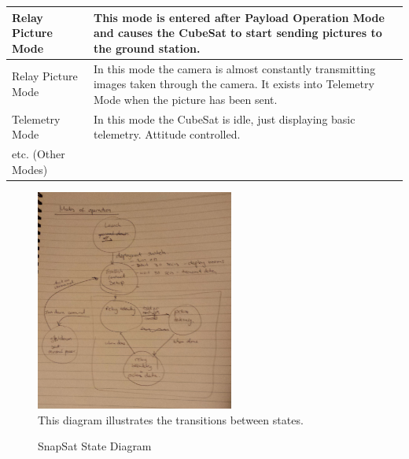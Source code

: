 \begin{table}[H]
{\begin{tabular}{|>{\arraybackslash}m{4.5cm}|>{\arraybackslash}m{10.5cm}|}
            \\\hline
            Relay Picture Mode & This mode is entered after Payload Operation Mode and causes the CubeSat to start sending pictures to the ground station. 
            \\\hline
            Relay Picture Mode & In this mode the camera is almost constantly transmitting images taken through the camera.  It exists into Telemetry Mode when the picture has been sent. 
            \\\hline
            Telemetry Mode & In this mode the CubeSat is idle, just displaying basic telemetry.  Attitude controlled.
            \\\hline
            etc. (Other Modes) &   \\\hline
        \end{tabular} } 
\end{table}

\begin{figure}[H]
    \centering
    \caption{SnapSat State Diagram}
    \vspace{0.15cm}
    \includegraphics[width=6.5cm]{ModesOfOperation.png}
    \\This diagram illustrates the transitions between states.
\end{figure}